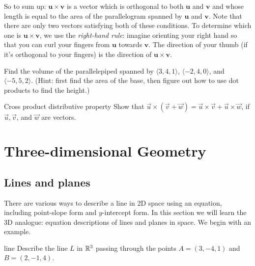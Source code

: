 \documentclass[prettycode,shellescape]{watsonbook}
\begin{document}
So to sum up: $\mathbf{u} \times \mathbf{v}$ is a vector which is
orthogonal to both $\mathbf{u}$ and $\mathbf{v}$ and whose length is
equal to the area of the parallelogram spanned by $\mathbf{u}$ and
$\mathbf{v}$. Note that there are only two vectors satisfying both of
these conditions. To determine which one is
$\mathbf{u} \times \mathbf{v}$, we use the \textit{right-hand rule}:
imagine orienting your right hand so that you can curl your fingers
from $\mathbf{u}$ towards $\mathbf{v}$. The direction of your thumb
(if it's orthogonal to your fingers) is the direction of
$\mathbf{u} \times \mathbf{v}$.

\begin{exercise}{}{}
  Find the volume of the parallelepiped spanned by
  $\langle 3,4,1 \rangle$,  $\langle -2,4,0 \rangle$, and 
  $\langle -5,5,2 \rangle$. (Hint: first find the area of the base,
  then figure out how to use dot products to find the height.) 
\end{exercise}

\begin{exercise}{Cross product distributive property}{}
  Show that $\vec{u} \times (\vec{v} + \vec{w}) = \vec{u}\times
  \vec{v} + \vec{u} \times \vec{w}$, if $\vec{u}, \vec{v}$, and
  $\vec{w}$ are vectors. 
\end{exercise}

\chapter{Three-dimensional Geometry}

\section{Lines and planes} \label{sec:lines_and_planes} 

There are various ways to describe a line in 2D space using an
equation, including point-slope form and $y$-intercept form. In this
section we will learn the 3D analogue: equation descriptions of lines
and planes in space. We begin with an example.

\begin{example}{}{line}
  Describe the line $L$ in $\mathbb{R}^3$ passing through the points
  $A = (3,-4,1)$ and $B = (2,-1,4)$.
\end{example}
\end{document}
